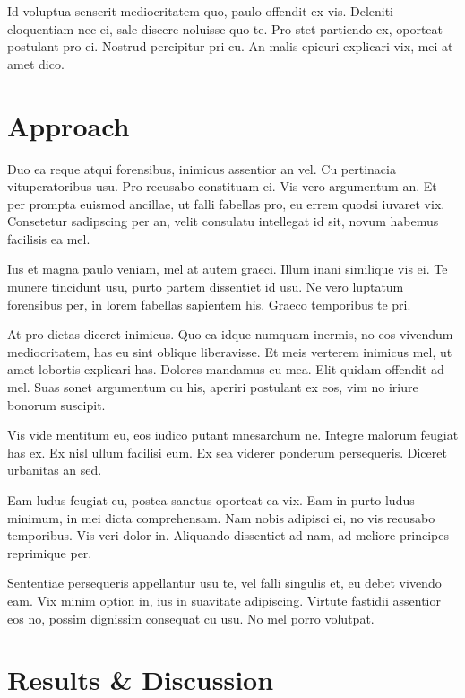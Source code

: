 \documentclass[twocolumn,twoside]{IEEEtran}
\begin{document}
 Id voluptua senserit mediocritatem quo, paulo offendit ex vis. Deleniti
 eloquentiam nec ei, sale discere noluisse quo te. Pro stet partiendo ex,
 oporteat postulant pro ei. Nostrud percipitur pri cu. An malis epicuri
 explicari vix, mei at amet dico.

\section*{Approach}
 Duo ea reque atqui forensibus, inimicus assentior an vel. Cu pertinacia
 vituperatoribus usu. Pro recusabo constituam ei. Vis vero argumentum an. Et
 per prompta euismod ancillae, ut falli fabellas pro, eu errem quodsi iuvaret
 vix. Consetetur sadipscing per an, velit consulatu intellegat id sit, novum
 habemus facilisis ea mel.

 Ius et magna paulo veniam, mel at autem graeci. Illum inani similique vis ei.
 Te munere tincidunt usu, purto partem dissentiet id usu. Ne vero luptatum
 forensibus per, in lorem fabellas sapientem his. Graeco temporibus te pri.

 At pro dictas diceret inimicus. Quo ea idque numquam inermis, no eos vivendum
 mediocritatem, has eu sint oblique liberavisse. Et meis verterem inimicus mel,
 ut amet lobortis explicari has. Dolores mandamus cu mea. Elit quidam offendit
 ad mel. Suas sonet argumentum cu his, aperiri postulant ex eos, vim no iriure
 bonorum suscipit.

 Vis vide mentitum eu, eos iudico putant mnesarchum ne. Integre malorum feugiat
 has ex. Ex nisl ullum facilisi eum. Ex sea viderer ponderum persequeris.
 Diceret urbanitas an sed.

 Eam ludus feugiat cu, postea sanctus oporteat ea vix. Eam in purto ludus
 minimum, in mei dicta comprehensam. Nam nobis adipisci ei, no vis recusabo
 temporibus. Vis veri dolor in. Aliquando dissentiet ad nam, ad meliore
 principes reprimique per.

 Sententiae persequeris appellantur usu te, vel falli singulis et, eu debet
 vivendo eam. Vix minim option in, ius in suavitate adipiscing. Virtute
 fastidii assentior eos no, possim dignissim consequat cu usu. No mel porro
 volutpat.

\section*{Results \& Discussion}



%
% 
%
%
%   
\end{document}
